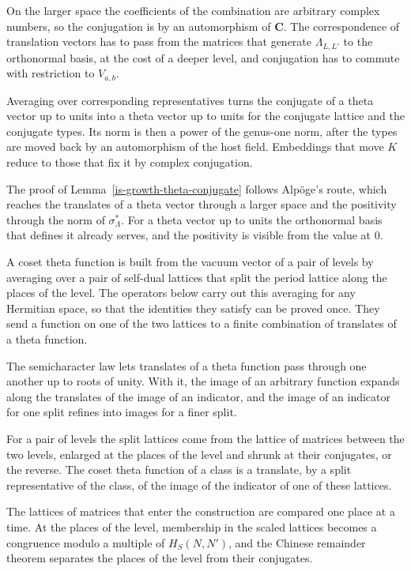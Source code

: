 On the larger space the coefficients of the combination are arbitrary complex numbers, so the conjugation
is by an automorphism of $\mathbf C$. The correspondence of translation vectors has to pass from the
matrices that generate $\Lambda_{L,L'}$ to the orthonormal basis, at the cost of a deeper level, and
conjugation has to commute with restriction to $V_{a,b}$.

Averaging over corresponding representatives turns the conjugate of a theta vector up to units into a
theta vector up to units for the conjugate lattice and the conjugate types. Its norm is then a power of
the genus-one norm, after the types are moved back by an automorphism of the host field. Embeddings that
move $K$ reduce to those that fix it by complex conjugation.

The proof of Lemma~\ref{is-growth-theta-conjugate} follows Alpöge's route, which reaches the translates
of a theta vector through a larger space and the positivity through the norm of $\sigma^*_\Lambda$. For
a theta vector up to units the orthonormal basis that defines it already serves, and the positivity is
visible from the value at $0$.

A coset theta function is built from the vacuum vector of a pair of levels by averaging over a pair of
self-dual lattices that split the period lattice along the places of the level. The operators below
carry out this averaging for any Hermitian space, so that the identities they satisfy can be proved
once. They send a function on one of the two lattices to a finite combination of translates of a
theta function.

The semicharacter law lets translates of a theta function pass through one another up to roots of
unity. With it, the image of an arbitrary function expands along the translates of the image of an
indicator, and the image of an indicator for one split refines into images for a finer split.

For a pair of levels the split lattices come from the lattice of matrices between the two levels,
enlarged at the places of the level and shrunk at their conjugates, or the reverse. The coset theta
function of a class is a translate, by a split representative of the class, of the image of the
indicator of one of these lattices.

The lattices of matrices that enter the construction are compared one place at a time. At the places of
the level, membership in the scaled lattices becomes a congruence modulo a multiple of $H_S(N,N')$, and
the Chinese remainder theorem separates the places of the level from their conjugates.

